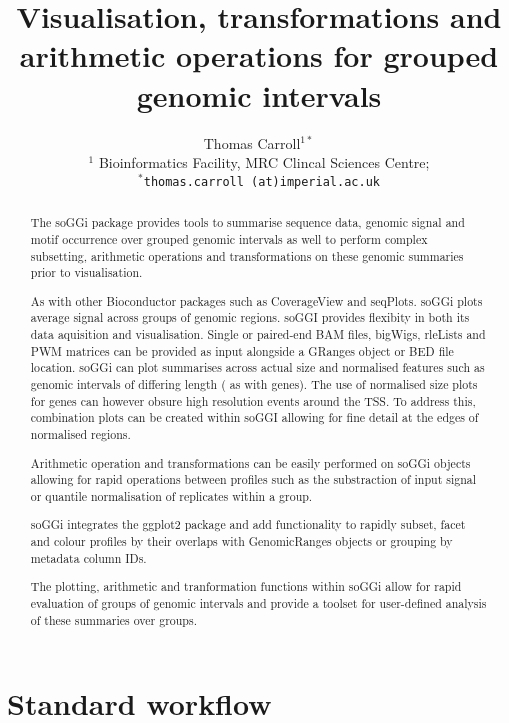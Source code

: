 \documentclass[12pt]{article}\usepackage[]{graphicx}\usepackage[usenames,dvipsnames]{color}
\author{Thomas Carroll$^{1*}$\\[1em] \small{$^{1}$ Bioinformatics Facility, MRC Clincal Sciences Centre;} \\ \small{\texttt{$^*$thomas.carroll (at)imperial.ac.uk}}}
\title{Visualisation, transformations and arithmetic operations for grouped genomic intervals}
\begin{document}
\maketitle

\begin{abstract}
 
The soGGi package provides tools to summarise sequence data, genomic signal and motif occurrence over grouped genomic intervals as well to perform complex subsetting, arithmetic operations and transformations on these genomic summaries prior to visualisation.


As with other Bioconductor packages such as CoverageView and seqPlots. soGGi plots average signal across groups of genomic regions. soGGI provides flexibity in both its data aquisition and visualisation. Single or paired-end BAM files, bigWigs, rleLists and PWM matrices can be provided  as input alongside a GRanges object or BED file location. soGGi can plot summarises across actual size and normalised features such as genomic intervals of differing length ( as with genes). The use of normalised size plots for genes can however obsure high resolution events around the TSS. To address this, combination plots can be created within soGGI allowing for fine detail at the edges of normalised regions.


Arithmetic operation and transformations can be easily performed on soGGi objects allowing for rapid operations between profiles such as the substraction of input signal or quantile normalisation of replicates within a group. 


soGGi integrates the ggplot2 package and add functionality to rapidly subset, facet and colour profiles by their overlaps with GenomicRanges objects or grouping by metadata column IDs. 


The plotting, arithmetic and tranformation functions within soGGi allow for rapid evaluation of groups of genomic intervals and provide a toolset for user-defined analysis of these summaries over groups.

  \vspace{1em}
  
  \end{abstract}



\newpage

\tableofcontents

\section{Standard workflow}
\end{document}
